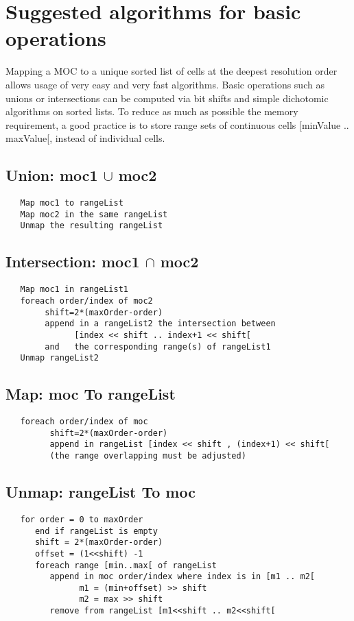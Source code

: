 \section{Suggested algorithms for basic operations}
Mapping a MOC to a unique sorted list of cells at the deepest
resolution order allows usage of very easy and very fast
algorithms. Basic operations such as unions or intersections can be
computed via bit shifts and simple dichotomic algorithms on sorted
lists.  To reduce as much as possible the memory requirement, a good
practice is to store range sets of continuous cells [minValue
  .. maxValue[, instead of individual cells.

\subsection{Union: moc1 $\cup$ moc2}
\begin{lstlisting}
   Map moc1 to rangeList
   Map moc2 in the same rangeList
   Unmap the resulting rangeList
\end{lstlisting}

\subsection{Intersection: moc1 $\cap$ moc2}
\begin{lstlisting}
   Map moc1 in rangeList1
   foreach order/index of moc2
        shift=2*(maxOrder-order)
        append in a rangeList2 the intersection between
              [index << shift .. index+1 << shift[
        and   the corresponding range(s) of rangeList1
   Unmap rangeList2
\end{lstlisting}

\subsection{Map: moc To rangeList}
\begin{lstlisting}
   foreach order/index of moc
         shift=2*(maxOrder-order)
         append in rangeList [index << shift , (index+1) << shift[
         (the range overlapping must be adjusted)
\end{lstlisting}

\subsection{Unmap: rangeList To moc}
\begin{lstlisting}
   for order = 0 to maxOrder
      end if rangeList is empty
      shift = 2*(maxOrder-order)
      offset = (1<<shift) -1
      foreach range [min..max[ of rangeList
         append in moc order/index where index is in [m1 .. m2[
               m1 = (min+offset) >> shift
               m2 = max >> shift
         remove from rangeList [m1<<shift .. m2<<shift[
\end{lstlisting}

